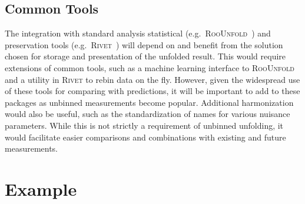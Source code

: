 \documentclass[a4paper,11pt]{article}
\begin{document}
\subsection{Common Tools}

The integration with standard analysis statistical (e.g.\ \textsc{RooUnfold}~\cite{adye2011unfolding}) and preservation tools (e.g.\ \textsc{Rivet}~\cite{Buckley:2010ar}) will depend on and benefit from the solution chosen for storage and presentation of the unfolded result.  This would require extensions of common tools, such as a machine learning interface to \textsc{RooUnfold} and a utility in \textsc{Rivet} to rebin data on the fly.  However, given the widespread use of these tools for comparing with predictions, it will be important to add to these packages as unbinned measurements become popular.  Additional harmonization would also be useful, such as the standardization of names for various nuisance parameters.  While this is not strictly a requirement of unbinned unfolding, it would facilitate easier comparisons and combinations with existing and future measurements.



\section{Example}
\label{sec:example}
\end{document}
